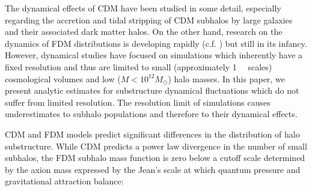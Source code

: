 \documentclass[usenatbib]{mnras}
\begin{document}
\par

The dynamical effects of CDM have been studied in some detail, especially regarding the accretion and tidal stripping of CDM subhalos by large galaxies and their associated dark matter halos. On the other hand, research on the dynamics of FDM distributions is developing rapidly (c.f. \cite{schive_solitons, Schrodinger-Poisson, Schive-virialized-wave-halos}) but still in its infancy. However, dynamical studies have focused on simulations which inherently have a fixed resolution and thus are limited to small (approximately \SI{1}{\mega \parsec} scales) cosmological volumes and low ($M < 10^{12} M_{\odot}$) halo masses. In this paper, we present analytic estimates for substructure dynamical fluctuations which do not suffer from limited resolution. The resolution limit of simulations causes underestimates to subhalo populations and therefore to their dynamical effects. 
\par 
	CDM and FDM models predict significant differences in the distribution of halo substructure. While CDM predicts a power law divergence in the number of small subhalos, the FDM subhalo mass function is zero below a cutoff scale determined by the axion mass expressed by the Jean’s scale at which quantum pressure and gravitational attraction balance:
\setlength{\belowdisplayskip}{4pt} \setlength{\belowdisplayshortskip}{4pt}
\setlength{\abovedisplayskip}{4pt} \setlength{\abovedisplayshortskip}{4pt}
\end{document}

